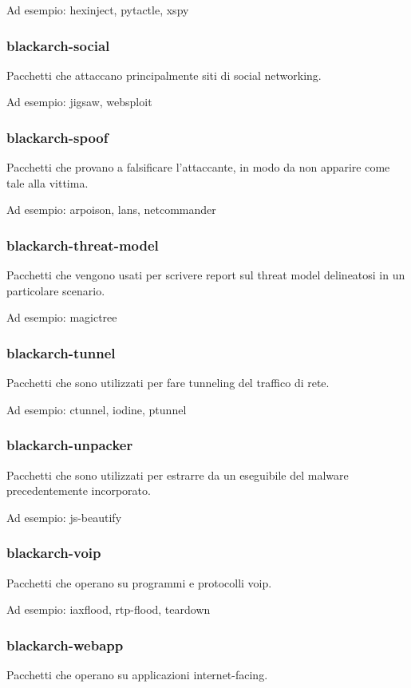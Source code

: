 \documentclass[a4paper, oneside, 11pt]{book}
\begin{document}
Ad esempio: hexinject, pytactle, xspy

\subsubsection{blackarch-social}
Pacchetti che attaccano principalmente siti di social networking.

Ad esempio: jigsaw, websploit

\subsubsection{blackarch-spoof}
Pacchetti che provano a falsificare l'attaccante, in modo da non apparire come tale alla vittima.

Ad esempio: arpoison, lans, netcommander

\subsubsection{blackarch-threat-model}
Pacchetti che vengono usati per scrivere report sul threat model delineatosi in un particolare scenario.

Ad esempio: magictree

\subsubsection{blackarch-tunnel}
Pacchetti che sono utilizzati per fare tunneling del traffico di rete.

Ad esempio: ctunnel, iodine, ptunnel

\subsubsection{blackarch-unpacker}
Pacchetti che sono utilizzati per estrarre da un eseguibile del malware precedentemente incorporato.

Ad esempio: js-beautify

\subsubsection{blackarch-voip}
Pacchetti che operano su programmi e protocolli voip.

Ad esempio: iaxflood, rtp-flood, teardown

\subsubsection{blackarch-webapp}
Pacchetti che operano su applicazioni internet-facing.
\end{document}
